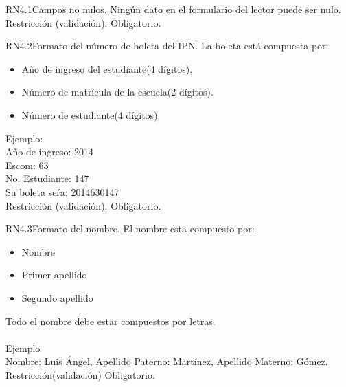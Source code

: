 
\begin{BussinesRule}{RN4.1}{Campos no nulos.} 
	\BRitem[Descripción:] Ningún dato en el formulario del lector puede ser nulo.
	\BRitem[Tipo:] Restricción (validación).
	\BRitem[Nivel:] Obligatorio.
\end{BussinesRule}


\begin{BussinesRule}{RN4.2}{Formato del número de boleta del IPN.}
	\BRitem[Descripción:] La boleta está compuesta por:
		\begin{itemize} 
			\item Año de ingreso del estudiante(4 dígitos).
			\item Número de matrícula de la escuela(2 dígitos).
			\item Número de estudiante(4 dígitos).
		\end{itemize}
	Ejemplo:\\
		Año de ingreso: 2014\\
		Escom: 63\\
		No. Estudiante: 147\\
		Su boleta seŕa: 2014630147\\
	\BRitem[Tipo:] Restricción (validación).
	\BRitem[Nivel:] Obligatorio.
\end{BussinesRule}


\begin{BussinesRule}{RN4.3}{Formato del nombre.}
	\BRitem[Descripción:] El nombre esta compuesto por:
		\begin{itemize} 
			\item Nombre
			\item Primer apellido
			\item Segundo apellido 
		\end{itemize}
		Todo el nombre debe estar compuestos por letras.\\\\
Ejemplo \\
	Nombre: Luis Ángel, Apellido Paterno: Martínez, Apellido Materno: Gómez.
	\BRitem[Tipo:] Restricción(validación)
	\BRitem[Nivel:] Obligatorio.
\end{BussinesRule}



